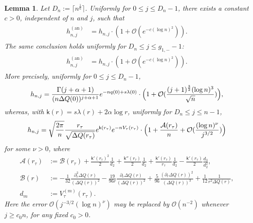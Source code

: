 \documentclass[a4paper]{article}
\newtheorem{lemma}[theorem]{Lemma}
\numberwithin{equation}{section}
\begin{document}
\begin{lemma}\label{lemma: 0 j j1-}
Let $D_n:=\lceil n^{\frac{1}{6}}\rceil$.
Uniformly for $0\leq j\leq D_n-1$, there exists a constant $c>0$, independent of $n$ and $j$, such that
\begin{align}
\begin{split}
h_{n,j}^{(\mathrm{an})}
&=h_{n,j}\cdot(1+\mathcal{O}(e^{-c (\log n)^2})).
\end{split}
\end{align}
The same conclusion holds uniformly for $D_n\leq j\leq g_{1,-}-1$:
\begin{align}
\begin{split}
h_{n,j}^{(\mathrm{an})}&
=h_{n,j}\cdot(1+\mathcal{O}(e^{-c (\log n)^2})).
\end{split}
\end{align}
More precisely, uniformly for $0\leq j\leq D_n-1$,
\begin{equation}
\label{def of 0 leq j leq Dn}
h_{n,j}=\frac{\Gamma(j+\alpha+1)}{(n\Delta Q(0))^{j+\alpha+1}}e^{-nq(0)+s\lambda(0)}\cdot\Bigl(1+\mathcal{O}(\frac{(j+1)^{\frac{3}{2}}(\log n)^3}{\sqrt{n}})\Bigr),    
\end{equation}
whereas, with $\mathsf{k}(r)=s\lambda(r)+2\alpha\log r$, uniformly for $D_n\leq j\leq n-1$,
\begin{equation}
\label{def of Dn leq j leq n-1}
h_{n,j}
=\sqrt{\frac{2\pi}{n}} \frac{r_{\tau}}{\sqrt{\Delta Q(r_{\tau})}}e^{\mathsf{k}(r_{\tau})}e^{-nV_{\tau}(r_{\tau})}\cdot\Bigl(1+\frac{\mathcal{A}(r_{\tau})}{n}+\mathcal{O}(\frac{(\log n)^{\nu}}{j^{3/2}})\Bigr)    
\end{equation}
for some $\nu>0$, where
\begin{align}
\mathcal{A}(r_{\tau})&:=\mathcal{B}(r_{\tau})+\frac{\mathsf{k}'(r_{\tau})^2}{2}\frac{1}{d_2}+\frac{\mathsf{k}''(r_{\tau})}{2}\frac{1}{d_2}+\frac{\mathsf{k}'(r_{\tau})}{r_{\tau}}\frac{1}{d_2}-\frac{\mathsf{k}'(r_{\tau})}{2}\frac{d_3}{d_2^2},   
\\
\mathcal{B}(r)&:=-\frac{1}{32}\frac{\partial_r^2\Delta Q(r)}{(\Delta Q(r))^2}-\frac{19}{96r}\frac{\partial_r\Delta Q(r)}{(\Delta Q(r))^2}+\frac{5}{96}\frac{(\partial_r \Delta Q(r))^2}{(\Delta Q(r))^3}+\frac{1}{12}\frac{1}{r^2\Delta Q(r)},      \\
d_m&:=V_{\tau}^{(m)}(r_{\tau}).
\end{align}
Here the error $\mathcal{O}(j^{-3/2}(\log n)^{\nu})$ may be replaced by $\mathcal{O}(n^{-2})$ whenever $j\geq c_0n$, for any fixed $c_0>0$.
\end{lemma}
\end{document}

